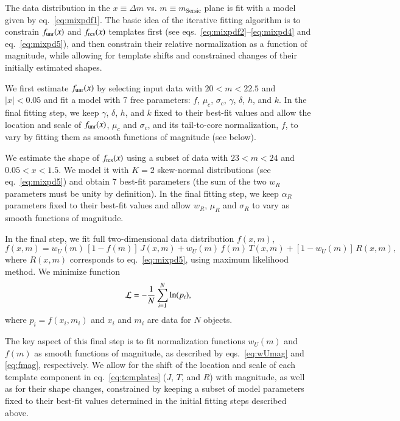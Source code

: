 \clearpage
 
\appendix{} 

\vskip -0.3in

The data distribution in the $x \equiv \Delta m$ vs. $m \equiv m_{\mathrm{Sersic}}$ plane is fit with a model
given by eq.~\ref{eq:mixpdf1}. The basic idea of the iterative fitting algorithm is to constrain
$f_{\rm unr}(x)$ and $f_{\rm res}(x)$ templates first (see eqs.~\ref{eq:mixpdf2}--\ref{eq:mixpd4} and
eq.~\ref{eq:mixpd5}), and then constrain their relative normalization as a function of magnitude,
while allowing for template shifts and constrained changes of their initially estimated shapes. 

We first estimate $f_{\rm unr}(x)$ by selecting input data with $20 < m<22.5$ and $|x| < 0.05$ and fit a model
with 7 free parameters: $f$, $\mu_c$, $\sigma_c$, $\gamma$, $\delta$, $h$, and $k$. In the final
fitting step, we keep $\gamma$, $\delta$, $h$, and $k$ fixed to their best-fit values and allow
the location and scale of $f_{\rm unr}(x)$, $\mu_c$ and $\sigma_c$, and its tail-to-core normalization,
$f$, to vary by fitting them as smooth functions of magnitude (see below).  

We estimate the shape of $f_{\rm res}(x)$ using a subset of data with $23 < m < 24$ and $0.05 < x < 1.5$. 
We model it with $K=2$ skew-normal distributions (see eq.~\ref{eq:mixpd5}) and obtain 7 best-fit
parameters (the sum of the two $w_R$ parameters must be unity by definition). In the final fitting
step, we keep $\alpha_R$ parameters fixed to their best-fit values and allow $w_R$,  $\mu_R$ and
$\sigma_R$ to vary as smooth functions of magnitude. 

In the final step, we fit full two-dimensional data distribution $f(x,m)$,
\begin{equation}
           f(x, m) = w_U(m) \,  [1 - f(m)] \, J(x,m)  + w_U(m) \, f(m) \, T(x,m) + [1 - w_U(m)] \, R(x,m),
   \label{eq:templates}         
\end{equation}
where $R(x,m)$ corresponds to eq.~\ref{eq:mixpd5}, using maximum likelihood method. We
minimize function
\begin{equation}
           \mathcal{L} = - {1 \over N} \sum_{i=1}^{N} {\rm ln} (p_i),
\end{equation}
where $p_i =  f(x_i, m_i)$ and $x_i$ and $m_i$ are data for $N$ objects. 

The key aspect of this final step is to fit normalization functions $w_U(m)$ and $f(m)$ as smooth
functions of magnitude, as described by eqs.~\ref{eq:wUmag} and \ref{eq:fmag}, respectively.
We allow for the shift of the location and scale of each template component in
eq.~\ref{eq:templates} ($J$, $T$, and $R$) with magnitude, as well as for their shape changes,
constrained by keeping a subset of model parameters fixed to their best-fit values determined
in the initial fitting steps described above.

